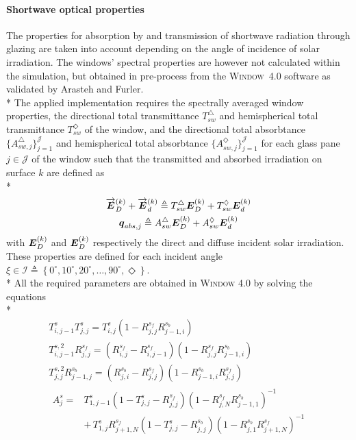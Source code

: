 \paragraph{Shortwave optical properties}
The properties for absorption by and transmission of shortwave radiation through glazing are taken into account depending on the angle of incidence of solar irradiation. The windows' spectral properties are however not calculated within the simulation, but obtained in pre-process from the \mbox{\textsc{Window} 4.0} software\citep{Lawrence1993,Finlayson1993} as validated by Arasteh\citep{Arasteh1986} and Furler\citep{Furler1988,Furler1991}. \\*
%
The applied implementation requires the spectrally averaged window properties, \ie the directional total transmittance $T_{sw}^{\triangle}$ and hemispherical total transmittance $T_{sw}^{\Diamond}$ of the window, and the directional total absorbtance $\{A_{sw,j}^{\triangle}\}_{j=1}^{\mathcal{J}}$ and hemispherical total absorbtance $\{A_{sw,j}^{\Diamond}\}_{j=1}^{\mathcal{J}}$ for each glass pane $j \in \mathcal{J}$ of the window such that the transmitted and absorbed irradiation on surface $k$ are defined as \\*
\begin{gather}
\overrightarrow{\boldsymbol{E}}_{D}^{(k)} + \overrightarrow{\boldsymbol{E}}_{d}^{(k)} \triangleq T_{sw}^{\triangle} \boldsymbol{E}_{D}^{(k)} + T_{sw}^{\Diamond} \boldsymbol{E}_{d}^{(k)}\\
\boldsymbol{q}_{abs,j} \triangleq A_{sw}^{\triangle} \boldsymbol{E}_{D}^{(k)} + A_{sw}^{\Diamond} \boldsymbol{E}_{d}^{(k)}
\end{gather}
with $\boldsymbol{E}_{D}^{(k)}$ and $\boldsymbol{E}_{D}^{(k)}$ respectively the direct and diffuse incident solar irradiation. These properties are defined for each incident angle $\xi \in \mathcal{I} \triangleq \left\{0^{\circ},10^{\circ},20^{\circ},\ldots ,90^{\circ},\Diamond \right\}$.\\*
%
All the required parameters are obtained in \textsc{Window} 4.0 by solving the equations \\*
\begin{gather}
T_{i,j-1}^{s} T_{j,j}^{s} = T_{i,j}^{s} \left( 1 - R_{j,j}^{s_{f}} R_{j-1,i}^{s_{b}}\right)\\
T_{i,j-1}^{s,2} R_{j,j}^{s_{f}} = \left(R_{i,j}^{s_{f}} - R_{i,j-1}^{s_{f}}\right) \left( 1 - R_{j,j}^{s_{f}} R_{j-1,i}^{s_{b}}\right)  \\
T_{j,j}^{s,2} R_{j-1,j}^{s_{b}} = \left(R_{j,i}^{s_{b}} - R_{j,j}^{s_{f}} \right)  \left( 1 - R_{j-1,i}^{s_{b}} R_{j,j}^{s_{f}}\right)\\
\begin{array}{ll}
A_{j}^{s} = & T_{1,j-1}^{s} \left( 1 - T_{j,j}^{s} - R_{j,j}^{s_{f}} \right) \left( 1 - R_{j,N}^{s_{f}} R_{j-1,1}^{s_{b}}\right)^{-1} \\
& + \, T_{1,j}^{s} R_{j+1,N}^{s_{f}} \left(1 - T_{j,j}^{s} - R_{j,j}^{s_{b}} \right) \left( 1 - R_{j,1}^{s_{b}} R_{j+1,N}^{s_{f}}\right)^{-1}
\end{array}
\end{gather}
